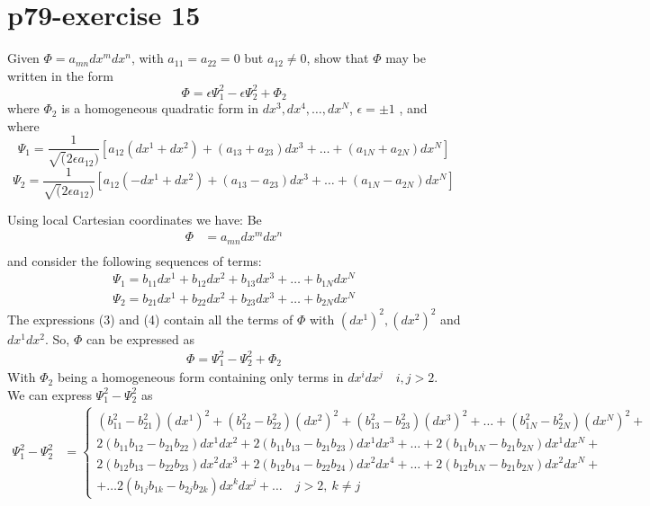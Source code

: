 \section{p79-exercise 15}
\begin{tcolorbox}
Given $\Phi = a_{mn}dx^m dx^n$, with $a_{11} = a_{22}= 0$ but $a_{12} \ne 0$, show that $\Phi$ may be written in the form $$ \Phi = \epsilon\Psi^2_1- \epsilon\Psi^2_2 + \Phi_2$$ where $\Phi_2$ is a homogeneous quadratic form in $ dx^3, dx^4, \dots ,dx^N $, $\epsilon = \pm 1$ , and where 
$$\Psi_1 = \frac{1}{\sqrt(2 \epsilon a_{12})}\left[ a_{12}(dx^1+dx^2) + (a_{13}+a_{23})dx^3+ \dots +(a_{1N}+a_{2N})dx^N \right]$$
$$\Psi_2 = \frac{1}{\sqrt(2 \epsilon a_{12})}\left[ a_{12}(-dx^1+dx^2) + (a_{13}-a_{23})dx^3+ \dots +(a_{1N}-a_{2N})dx^N \right]$$
\end{tcolorbox}
Using local Cartesian coordinates we have:
Be 
\begin{align}
\Phi &= a_{mn}dx^mdx^n\\ 
\end{align}
and consider the following sequences of terms: 
\begin{align}
\Psi_1 =  b_{11}dx^1+b_{12}dx^2 + b_{13}dx^3+ \dots +b_{1N}dx^N \\
\Psi_2 =  b_{21}dx^1+b_{22}dx^2 + b_{23}dx^3+ \dots +b_{2N}dx^N 
\end{align}
The expressions (3) and (4) contain all the terms of $\Phi$ with $(dx^1)^2,(dx^2)^2$ and $dx^1dx^2$. So, $\Phi$ can be expressed as 
\begin{align}
\Phi =\Psi_1^2 -\Psi_2^2 + \Phi_2 
\end{align}
With $\Phi_2 $ being a homogeneous form containing only terms in $dx^i dx^j \quad i,j > 2$.\\
We can express $\Psi_1^2 - \Psi_2^2$ as
\begin{align}
\Psi_1^2 - \Psi_2^2 &= \left \{ \begin{array}{l}(b_{11}^2 - b_{21}^2)(dx^1)^2 +(b_{12}^2 - b_{22}^2)(dx^2)^2 +(b_{13}^2 - b_{23}^2)(dx^3 )^2 + \dots +(b_{1N}^2 - b_{2N}^2)(dx^N)^2 +\\
 2( b_{11} b_{12}-b_{21} b_{22})dx^1dx^2+2( b_{11} b_{13}-b_{21} b_{23})dx^1dx^3+\dots + 2( b_{11} b_{1N}-b_{21} b_{2N})dx^1dx^N+\\
 2( b_{12} b_{13}-b_{22} b_{23})dx^2dx^3+2( b_{12} b_{14}-b_{22} b_{24})dx^2dx^4+\dots + 2( b_{12} b_{1N}-b_{21} b_{2N})dx^2dx^N+\\
 + \dots 2( b_{1j} b_{1k}-b_{2j} b_{2k})dx^kdx^j+\dots\quad j>2, \ k\ne j
\end{array} \right.
\end{align}
